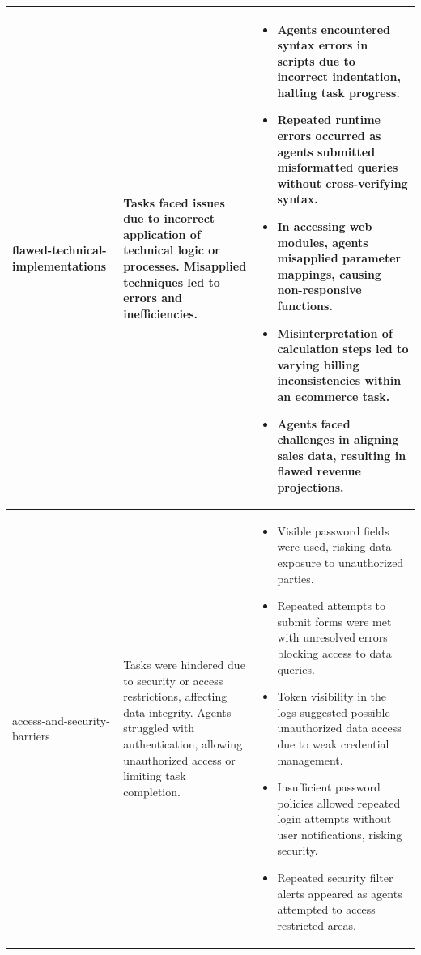 \begin{longtable}{p{} p{} p{}}
flawed-technical-implementations &
Tasks faced issues due to incorrect application of technical logic or processes. Misapplied techniques led to errors and inefficiencies. &
\begin{itemize}
  \item Agents encountered syntax errors in scripts due to incorrect indentation, halting task progress.
  \item Repeated runtime errors occurred as agents submitted misformatted queries without cross-verifying syntax.
  \item In accessing web modules, agents misapplied parameter mappings, causing non-responsive functions.
  \item Misinterpretation of calculation steps led to varying billing inconsistencies within an ecommerce task.
  \item Agents faced challenges in aligning sales data, resulting in flawed revenue projections.
\end{itemize}
\\ \hline

access-and-security-barriers &
Tasks were hindered due to security or access restrictions, affecting data integrity. Agents struggled with authentication, allowing unauthorized access or limiting task completion. &
\begin{itemize}
  \item Visible password fields were used, risking data exposure to unauthorized parties.
  \item Repeated attempts to submit forms were met with unresolved errors blocking access to data queries.
  \item Token visibility in the logs suggested possible unauthorized data access due to weak credential management.
  \item Insufficient password policies allowed repeated login attempts without user notifications, risking security.
  \item Repeated security filter alerts appeared as agents attempted to access restricted areas.
\end{itemize}
\\ \hline


\end{longtable}
